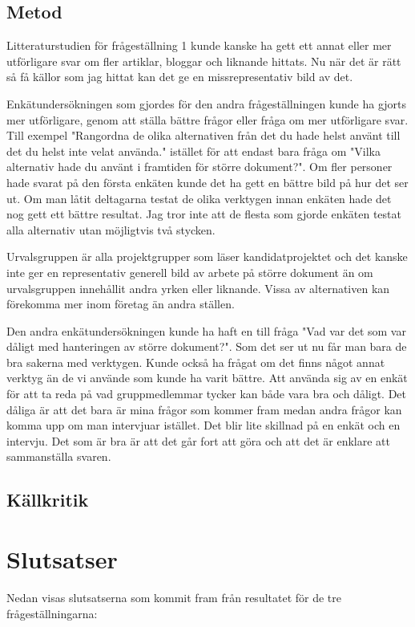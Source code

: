 \subsection{Metod}
Litteraturstudien för frågeställning 1 kunde kanske ha gett ett annat eller mer utförligare svar om fler artiklar, bloggar och liknande hittats. Nu när det är rätt så få källor som jag hittat kan det ge en missrepresentativ bild av det.

Enkätundersökningen som gjordes för den andra frågeställningen kunde ha gjorts mer utförligare, genom att ställa bättre frågor eller fråga om mer utförligare svar. Till exempel "Rangordna de olika alternativen från det du hade helst använt till det du helst inte velat använda." istället för att endast bara fråga om "Vilka alternativ hade du använt i framtiden för större dokument?". Om fler personer hade svarat på den första enkäten kunde det ha gett en bättre bild på hur det ser ut. Om man låtit deltagarna testat de olika verktygen innan enkäten hade det nog gett ett bättre resultat. Jag tror inte att de flesta som gjorde enkäten testat alla alternativ utan möjligtvis två stycken.

Urvalsgruppen är alla projektgrupper som läser kandidatprojektet och det kanske inte ger en representativ generell bild av arbete på större dokument än om urvalsgruppen innehållit andra yrken eller liknande. Vissa av alternativen kan förekomma mer inom företag än andra ställen.

Den andra enkätundersökningen kunde ha haft en till fråga "Vad var det som var dåligt med hanteringen av större dokument?". Som det ser ut nu får man bara de bra sakerna med verktygen. Kunde också ha frågat om det finns något annat verktyg än de vi använde som kunde ha varit bättre. Att använda sig av en enkät för att ta reda på vad gruppmedlemmar tycker kan både vara bra och dåligt. Det dåliga är att det bara är mina frågor som kommer fram medan andra frågor kan komma upp om man intervjuar istället. Det blir lite skillnad på en enkät och en intervju. Det som är bra är att det går fort att göra och att det är enklare att sammanställa svaren.

\subsection{Källkritik}

\section{Slutsatser}
\label{sec:conclusions-tuhkala}
Nedan visas slutsatserna som kommit fram från resultatet för de tre frågeställningarna:

